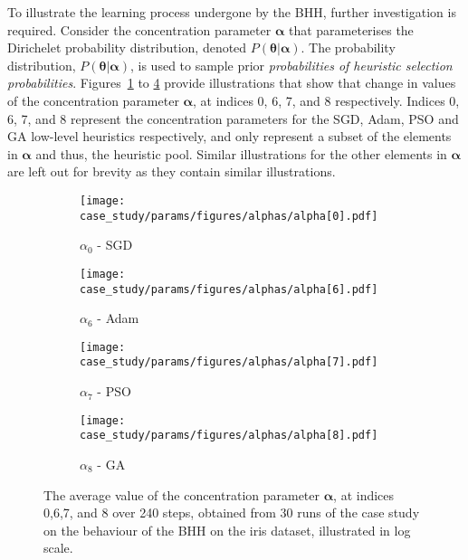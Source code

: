 To illustrate the learning process undergone by the \acs{BHH}, further investigation is required. Consider the concentration parameter $\boldsymbol{\alpha}$ that parameterises the Dirichelet probability distribution, denoted $P(\boldsymbol{\theta} \vert \boldsymbol{\alpha})$. The probability distribution, $P(\boldsymbol{\theta} \vert \boldsymbol{\alpha})$, is used to sample prior \textit{probabilities of heuristic selection probabilities}. Figures~\ref{fig:results:case_study:alphas:0} to \ref{fig:results:case_study:alphas:8} provide illustrations that show that change in values of the concentration parameter $\boldsymbol{\alpha}$, at indices 0, 6, 7, and 8 respectively. Indices 0, 6, 7, and 8 represent the concentration parameters for the \acs{SGD}, \acs{Adam}, \acs{PSO} and \acs{GA} low-level heuristics respectively, and only represent a subset of the elements in $\boldsymbol{\alpha}$ and thus, the heuristic pool. Similar illustrations for the other elements in $\boldsymbol{\alpha}$ are left out for brevity as they contain similar illustrations.

\begin{figure}[htb]
      \begin{subfigure}{0.5\textwidth}
            \centering
            \texttt{[image: case\_study/params/figures/alphas/alpha[0].pdf]}
            \caption{$\alpha_{0}$ - \acs{SGD}}
            \label{fig:results:case_study:alphas:0}
      \end{subfigure}
      \begin{subfigure}{0.5\textwidth}
            \centering
            \texttt{[image: case\_study/params/figures/alphas/alpha[6].pdf]}
            \caption{$\alpha_{6}$ - \acs{Adam}}
            \label{fig:results:case_study:alphas:6}
      \end{subfigure}
      \par\bigskip
      \begin{subfigure}{0.5\textwidth}
            \centering
            \texttt{[image: case\_study/params/figures/alphas/alpha[7].pdf]}
            \caption{$\alpha_{7}$ - \acs{PSO}}
            \label{fig:results:case_study:alphas:7}
      \end{subfigure}
      \begin{subfigure}{0.5\textwidth}
            \centering
            \texttt{[image: case\_study/params/figures/alphas/alpha[8].pdf]}
            \caption{$\alpha_{8}$ - \acs{GA}}
            \label{fig:results:case_study:alphas:8}
      \end{subfigure}
      \par\bigskip
      \caption{The average value of the concentration parameter $\boldsymbol{\alpha}$, at indices 0,6,7, and 8 over 240 steps, obtained from 30 runs of the case study on the behaviour of the \acs{BHH} on the iris dataset, illustrated in log scale.}
      \label{fig:results:case_study:alphas}
\end{figure}


